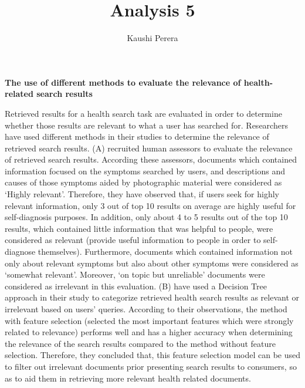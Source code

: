 \documentclass[]{article}
\title{Analysis 5}
\author{Kaushi Perera}
\begin{document}
	
\maketitle
	
\textbf{The use of different methods to evaluate the relevance of health-related search results}

Retrieved results for a health search task are evaluated in order to determine whether those results are relevant to what a user has searched for. Researchers have used different methods in their studies to determine the relevance of retrieved search results. (A) recruited human assessors to evaluate the relevance of retrieved search results. According these assessors, documents which contained information focused on the symptoms searched by users, and descriptions and causes of those symptoms aided by photographic material were considered as ‘Highly relevant’. Therefore, they have observed that, if users seek for highly relevant information, only 3 out of top 10 results on average are highly useful for self-diagnosis purposes. In addition, only about 4 to 5 results out of the top 10 results, which contained little information that was helpful to people, were considered as relevant (provide useful information to people in order to self-diagnose themselves). Furthermore, documents which contained information not only about relevant symptoms but also about other symptoms were considered as ‘somewhat relevant’. Moreover, ‘on topic but unreliable’ documents were considered as irrelevant in this evaluation. (B) have used a Decision Tree approach in their study to categorize retrieved health search results as relevant or irrelevant based on users' queries. According to their observations, the method with feature selection (selected the most important features which were strongly related to relevance) performs well and has a higher accuracy when determining the relevance of the search results compared to the method without feature selection. Therefore, they concluded that, this feature selection model can be used to filter out irrelevant documents prior presenting search results to consumers, so as to aid them in retrieving more relevant health related documents.     

   
\end{document}

